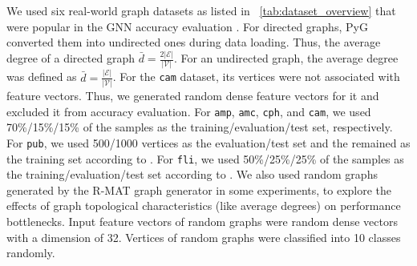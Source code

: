 We used six real-world graph datasets as listed in \tablename~\ref{tab:dataset_overview} that were popular in the GNN accuracy evaluation \cite{chen2018_fastgcn, zeng2020_graphsaint, shchur2018_pitfall_of_gnn, yang2012_defining}.
%
For directed graphs, PyG converted them into undirected ones during data loading.
%
Thus, the average degree of a directed graph $\bar{d}=\frac{2|\mathcal{E}|}{|\mathcal{V}|}$.
%
For an undirected graph, the average degree was defined as $\bar{d}=\frac{|\mathcal{E}|}{|\mathcal{V}|}$.
%
For the \texttt{cam} dataset, its vertices were not associated with feature vectors.
%
Thus, we generated random dense feature vectors for it and excluded it from accuracy evaluation.
%
For \texttt{amp}, \texttt{amc}, \texttt{cph}, and \texttt{cam}, we used 70\%/15\%/15\% of the samples as the training/evaluation/test set, respectively.
%
For \texttt{pub}, we used 500/1000 vertices as the evaluation/test set and the remained as the training set according to \cite{chen2018_fastgcn}.
%
For \texttt{fli}, we used 50\%/25\%/25\% of the samples as the training/evaluation/test set according to \cite{zeng2020_graphsaint}.
%
We also used random graphs generated by the R-MAT graph generator \cite{rmat-generator} in some experiments, to explore the effects of graph topological characteristics (like average degrees) on performance bottlenecks.
%
Input feature vectors of random graphs were random dense vectors with a dimension of 32.
%
Vertices of random graphs were classified into 10 classes randomly.

